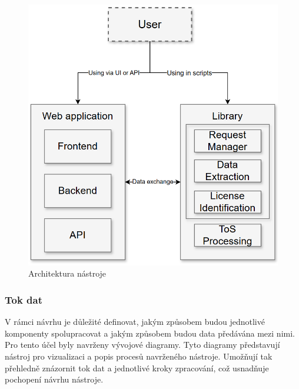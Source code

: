 \begin{figure}[H]
    \centering
    \includegraphics[width=\linewidth]{images/architecture}
    \caption{Architektura nástroje}
    \label{fig:architecture}
\end{figure}

\subsubsection{Tok dat}
V rámci návrhu je důležité definovat, jakým způsobem budou jednotlivé komponenty spolupracovat a jakým způsobem budou data předávána mezi nimi.
Pro tento účel byly navrženy vývojové diagramy.
Tyto diagramy představují nástroj pro vizualizaci a popis procesů navrženého nástroje.
Umožňují tak přehledně znázornit tok dat a jednotlivé kroky zpracování, což usnadňuje pochopení návrhu nástroje.

